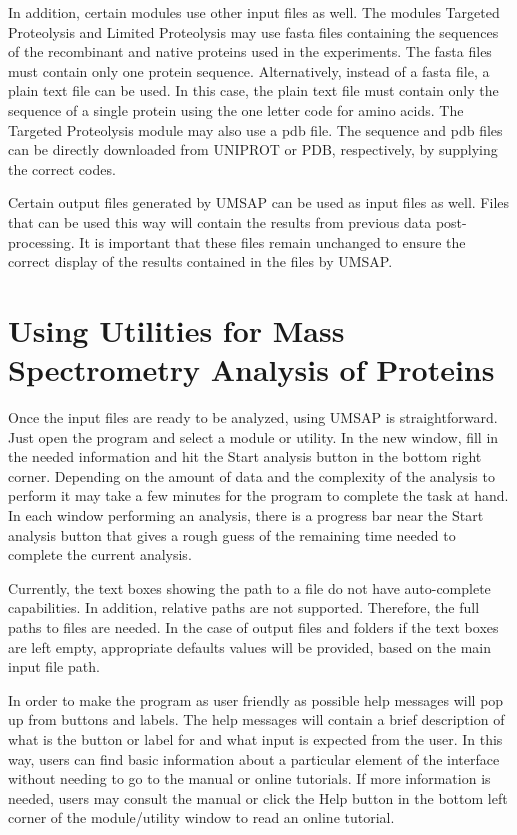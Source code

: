 In addition, certain modules use other input files as well. The modules Targeted Proteolysis and Limited Proteolysis may use fasta files containing the sequences of the recombinant and native proteins used in the experiments. The fasta files must contain only one protein sequence. Alternatively, instead of a fasta file, a plain text file can be used. In this case, the plain text file must contain only the sequence of a single protein using the one letter code for amino acids. The Targeted Proteolysis module may also use a pdb file. The sequence and pdb files can be directly downloaded from UNIPROT or PDB, respectively,  by supplying the correct codes.

Certain output files generated by UMSAP can be used as input files as well. Files that can be used this way will contain the results from previous data post-processing. It is important that these files remain unchanged to ensure the correct display of the results contained in the files by UMSAP.

\section{Using Utilities for Mass Spectrometry Analysis of Proteins}

Once the input files are ready to be analyzed, using UMSAP is straightforward. Just open the program and select a module or utility. In the new window, fill in the needed information and hit the Start analysis button in the bottom right corner. Depending on the amount of data and the complexity of the analysis to perform it may take a few minutes for the program to complete the task at hand. In each window performing an analysis, there is a progress bar near the Start analysis button that gives a rough guess of the remaining time needed to complete the current analysis.

Currently, the text boxes showing the path to a file  do not have auto-complete capabilities. In addition, relative paths are not supported. Therefore, the full paths to files are needed. In the case of output files and folders if the text boxes are left empty, appropriate defaults values will be provided, based on the main input file path.  

In order to make the program as user friendly as possible help messages will pop up from buttons and labels. The help messages will contain a brief description of what is the button or label for and what input is expected from the user. In this way, users can find basic information about a particular element of the interface without needing to go to the manual or online tutorials. If more information is needed, users may consult the manual or click the Help button in the bottom left corner of the module/utility window to read an online tutorial. 

